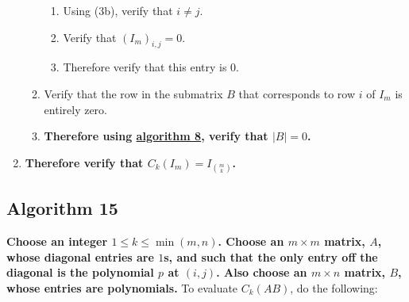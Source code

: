\documentclass[twocolumn]{article}
\begin{document}
\begin{enumerate}
\begin{enumerate}
\begin{enumerate}
						\item Using (3b), verify that $i\ne j$.
						\item Verify that $(I_m)_{i,j}=0$.
						\item Therefore verify that this entry is $0$.
					\end{enumerate}
					\item Verify that the row in the submatrix $B$ that corresponds to row $i$ of $I_m$ is entirely zero.
					\item \textbf{Therefore using \hyperref[sec:algorithm 8]{algorithm 8}, verify that $\lvert B\rvert=0$.}
				\end{enumerate}
				\item \textbf{Therefore verify that $C_k(I_m)=I_{\binom{m}{k}}$.}	
			\end{enumerate}
		\subsection{Algorithm 15}\label{sec:algorithm 15}
			\textbf{Choose an integer $1\le k\le\min(m,n)$. Choose an $m\times m$ matrix, $A$, whose diagonal entries are $1$s, and such that the only entry off the diagonal is the polynomial $p$ at $(i,j)$. Also choose an $m\times n$ matrix, $B$, whose entries are polynomials.} To evaluate $C_k(AB)$, do the following:
\end{document}
